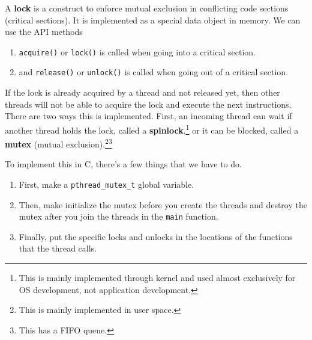 \documentclass{article}
\newcounter{definition}[section]
\newcounter{code}[section]
\begin{document}
    \begin{definition}[Lock]
      \label{def:lock}
      A \textbf{lock} is a construct to enforce mutual exclusion in conflicting code sections (critical sections). It is implemented as a special data object in memory. We can use the API methods
      \begin{enumerate}
        \item \texttt{acquire()} or \texttt{lock()} is called when going into a critical section. 
        \item and \texttt{release()} or \texttt{unlock()} is called when going out of a critical section. 
      \end{enumerate}
      If the lock is already acquired by a thread and not released yet, then other threads will not be able to acquire the lock and execute the next instructions. There are two ways this is implemented. First, an incoming thread can wait if another thread holds the lock, called a \textbf{spinlock},\footnote{This is mainly implemented through kernel and used almost exclusively for OS development, not application development.} or it can be blocked, called a \textbf{mutex} (mutual exclusion).\footnote{This is mainly implemented in user space. }\footnote{This has a FIFO queue. }
    \end{definition}

    To implement this in C, there's a few things that we have to do. 
    \begin{enumerate}
      \item First, make a \texttt{pthread\_mutex\_t} global variable. 
      \item Then, make initialize the mutex before you create the threads and destroy the mutex after you join the threads in the \texttt{main} function. 
      \item Finally, put the specific locks and unlocks in the locations of the functions that the thread calls. 
    \end{enumerate}
\end{document}
